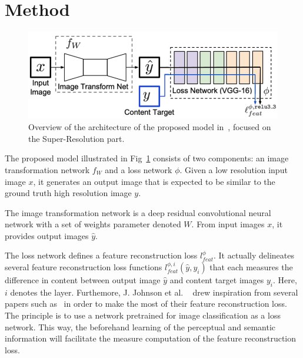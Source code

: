 \documentclass{article}
\begin{document}
{
    \section{Method}
    \label{sec:method}

        \begin{figure}[ht]
            \centering
            \includegraphics[width=\textwidth]{images/model.png}
            \caption{Overview of the architecture of the proposed model in~\cite{https://doi.org/10.48550/arxiv.1603.08155}, focused on the Super-Resolution part.}
            \label{fig:model}
        \end{figure}


        The proposed model illustrated in Fig~\ref{fig:model} consists of two components: an image transformation network $f_W$ and a loss network $\phi$. Given a low resolution input image $x$, it generates an output image that is expected to be similar to the ground truth high resolution image $y$.
        
        The image transformation network is a deep residual convolutional neural network with a set of weights parameter denoted $W$. From input images $x$, it provides output images $\hat y$. 
        
        The loss network defines a feature reconstruction loss $l^\phi_{feat}$. It actually delineates several feature reconstruction loss functions $l^{\phi, i}_{feat}(\hat y, y_i)$ that each measures the difference in content between output image $\hat y$ and content target images $y_i$. Here, $i$ denotes the layer.
        Furthemore, J. Johnson et al. ~\cite{https://doi.org/10.48550/arxiv.1603.08155} drew inspiration from several papers such as~\cite{gatys} in order to make the most of their feature reconstruction loss. The principle is to use a network pretrained for image classification as a loss network. This way, the beforehand learning of the perceptual and semantic information will facilitate the measure computation of the feature reconstruction loss. 

}
\end{document}
